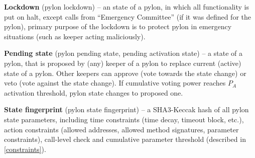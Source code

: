 \documentclass[12pt]{article}
\begin{document}
\smallskip
\noindent \textbf{Lockdown} (pylon lockdown) -- an state of a pylon, in which all functionality is put on halt, except calls from ``Emergency Committee'' (if it was defined for the pylon), primary purpose of the lockdown is to protect pylon in emergency situations (such as keeper acting maliciously).

\smallskip
\noindent \textbf{Pending state} (pylon pending state, pending activation state) -- a state of a pylon, that is proposed by (any) keeper of a pylon to replace current (active) state of a pylon. Other keepers can approve (vote towards the state change) or veto (vote against the state change). If cumulative voting power reaches $P_A$ activation threshold, pylon state changes to proposed one.

\smallskip
\noindent \textbf{State fingerprint} (pylon state fingerprint) -- a SHA3-Keccak hash of all pylon state parameters, including time constraints (time decay, timeout block, etc.), action constraints (allowed addresses, allowed method signatures, parameter constraints), call-level check and cumulative parameter threshold (described in \ref{constraints}).

\pagebreak


\end{document}
